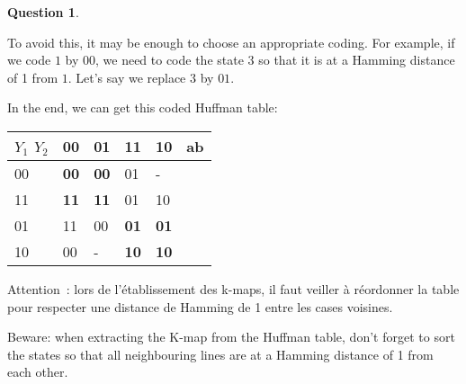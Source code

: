 \documentclass[11pt,a4paper,dvipsnames]{article}
\theoremstyle{definition}%
\newtheorem{Q}{Question}[] %
\newcommand{\fr}[1]{
 	\ifthenelse {\boolean{fr}} {#1} {}
 }
\newcommand{\en}[1]{
 	\ifthenelse {\boolean{en}} {#1} {}
 }
\begin{document}
\begin{Q}
\begin{enumerate}
{{			To avoid this, it may be enough to choose an appropriate coding.
			For example,  if we code $1$ by $00$, we need to code the state $3$ so that it is at a Hamming distance of 1 from $1$. Let's say we replace $3$ by $01$.

			In the end, we can get this coded Huffman table:}
			\begin{center}
				\begin{tabular}{|l|l|l|l|l|l}
				\hline
				 $Y_1$ $Y_2$ & 00         & 01         & 11         & 10         & \multicolumn{1}{l|}{ab} \\ \hline
				00 & \textbf{00} & \textbf{00} & 01          & -          &    \\ \cline{1-5}
				11 & \textbf{11} & \textbf{11} & 01          & 10          &    \\ \cline{1-5}
				01 & 11          & 00          & \textbf{01} & \textbf{01} &    \\ \cline{1-5}
				10 & 00         & -          & \textbf{10} & \textbf{10} &    \\ \cline{1-5}
				\end{tabular}
			\end{center}

			\fr{Attention~: lors de l'établissement des k-maps, il faut veiller à réordonner la table pour respecter une distance de Hamming de 1 entre les cases voisines.}
			\en{Beware: when extracting the K-map from the Huffman table, don't forget to sort the states so that all neighbouring lines are at a Hamming distance of 1 from each other.}

			\begin{center}

			\end{center}


}
\end{enumerate}
\end{Q}
\end{document}
